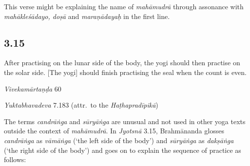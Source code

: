 \begin{ekdosis}
\begin{philcomm}[hp03_014]
This verse might be explaining the name of \emph{mahāmudrā} through assonance with \emph{mahākleśādayo, doṣā} and \emph{maraṇādayaḥ} in the first line.
\end{philcomm}

\subsection*{3.15}
\begin{translation}[hp03_015]
After practising on the lunar side of the body, the yogi should then practise on the solar side. [The yogi] should finish practising the seal when the count is even.
\end{translation}

\begin{sources}[hp03_015]
\emph{Vivekamārtaṇḍa} 60
\begin{versinnote}
\end{versinnote}
\end{sources}

\begin{testimonia}[hp03_015]
\emph{Yuktabhavadeva} 7.183 (attr.~to the \emph{Haṭhapradīpikā})
\begin{versinnote}
\end{versinnote}
\end{testimonia}

\begin{philcomm}[hp03_015]
The terms \emph{candrāṅga} and \emph{sūryāṅga} are unusual and not used in other yoga texts outside the context of \emph{mahāmudrā}. In \emph{Jyotsnā} 3.15, Brahmānanda glosses \emph{candrāṅga} as \emph{vāmāṅga} (`the left side of the body') and \emph{sūryāṅga} as \emph{dakṣāṅga} (`the right side of the body') and goes on to explain the sequence of practice as follows:


\end{philcomm}
\end{ekdosis}
